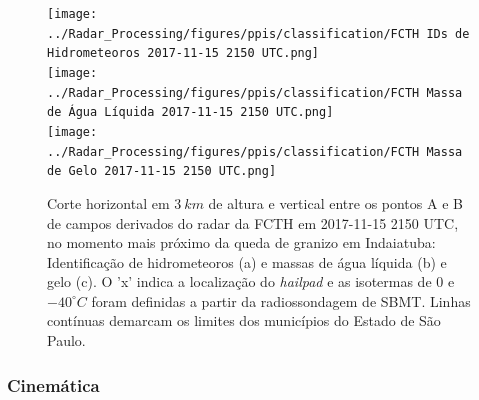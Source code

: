 \begin{figure}[htb]
	\centering
	\caption{Corte horizontal em $3\:km$ de altura e vertical entre os pontos A e B de campos derivados do radar da FCTH em 2017-11-15 2150 UTC, no momento mais próximo da queda de granizo em Indaiatuba: Identificação de hidrometeoros (a) e massas de água líquida (b) e gelo (c). O 'x' indica a localização do \textit{hailpad} e as isotermas de $0$ e $-40^{\circ}C$ foram definidas a partir da radiossondagem de SBMT. Linhas contínuas demarcam os limites dos municípios do Estado de São Paulo.} 
	\label{radar_derived_20171115}
	\vspace{-5pt}
	\texttt{[image: ../Radar\_Processing/figures/ppis/classification/FCTH IDs de Hidrometeoros 2017-11-15 2150 UTC.png]} \\
	\vspace{-5pt}
	\texttt{[image: ../Radar\_Processing/figures/ppis/classification/FCTH Massa de Água Líquida 2017-11-15 2150 UTC.png]} \\
	\vspace{-5pt}
	\texttt{[image: ../Radar\_Processing/figures/ppis/classification/FCTH Massa de Gelo 2017-11-15 2150 UTC.png]} \\
\end{figure}

\subsubsection{Cinemática}\label{cinematica_20171115}


